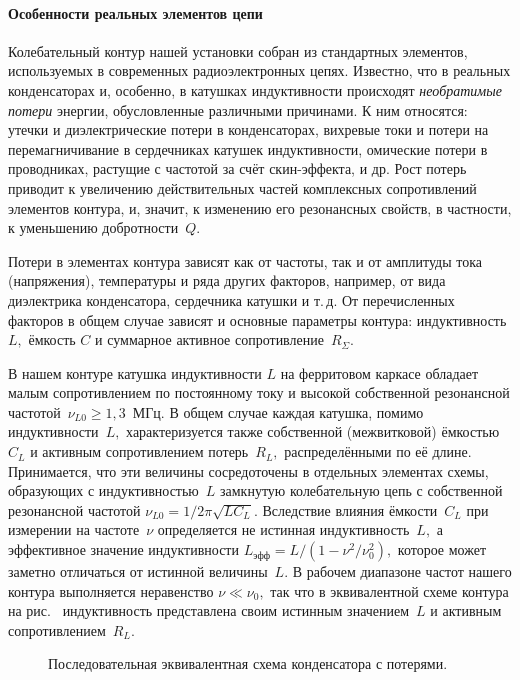 \paragraph{Особенности реальных элементов цепи}
\label{par:real_elements}

Колебательный контур нашей установки собран из стандартных элементов,
используемых в современных радиоэлектронных цепях. Известно, что в реальных
конденсаторах и, особенно, в катушках индуктивности происходят 
\emph{необратимые потери} энергии, обусловленные различными причинами. К ним относятся: утечки и
диэлектрические потери в конденсаторах, вихревые токи и потери на
перемагничивание в сердечниках катушек индуктивности, омические потери в
проводниках, растущие с частотой за счёт скин-эффекта, и др. Рост
потерь приводит к увеличению действительных частей комплексных сопротивлений
элементов контура, и, значит, к изменению его резонансных свойств, в частности,
к уменьшению добротности~$Q$.

Потери в элементах контура зависят как от частоты, так и от амплитуды тока
(напряжения), температуры и ряда других факторов, например, от вида диэлектрика
конденсатора, сердечника катушки и т.\,д. От перечисленных факторов в общем случае
зависят и основные параметры контура: индуктивность $L,$ ёмкость $C$ и суммарное
активное сопротивление~$R_{\Sigma}$.

В нашем контуре катушка индуктивности $L$ на ферритовом каркасе обладает малым
сопротивлением по постоянному току и высокой собственной резонансной
частотой~$\nu_{L0}\ge1,3$~МГц. В общем случае каждая катушка, помимо индуктивности~$L,$ характеризуется также собственной (межвитковой) ёмкостью $C_L$ и активным
сопротивлением потерь~$R_L,$ распределёнными по её длине. Принимается, что эти
величины сосредоточены в отдельных элементах схемы, образующих с индуктивностью~$L$ 
замкнутую колебательную цепь с собственной резонансной частотой
$\nu_{L0}=1/2\pi\sqrt{LC_L}.$ Вследствие влияния ёмкости~$C_L$ при измерении на
частоте~$\nu$ определяется не истинная индуктивность~$L,$ а эффективное значение
индуктивности $L_{эфф}=L/(1-\nu^2/\nu_0^2),$ которое может заметно отличаться от
истинной величины~$L.$ В рабочем диапазоне частот нашего контура выполняется
неравенство $\nu \ll \nu_0,$ так что в эквивалентной схеме контура на рис.~
индуктивность представлена своим истинным значением~$L$ и активным
сопротивлением~$R_L.$

\begin{figure}[h!]
    \centering\small
    \caption{Последовательная эквивалентная схема конденсатора с потерями.}
\end{figure}

